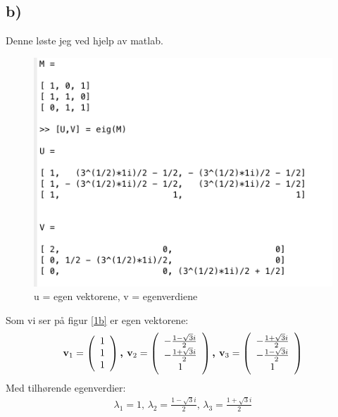 \documentclass[a4paper,12pt,norsk]{article}
\begin{document}
\subsection{b)}
Denne løste jeg ved hjelp av matlab.\\
\begin{figure}[h!]
\includegraphics[width = 1\textwidth]{11b.png} 
\caption{u = egen vektorene, v = egenverdiene}
\label{1b}
\end{figure} 

Som vi ser på figur \vref{1b} er egen vektorene: 
\begin{align*}
\bold{v}_1 = \left({\begin{array}{cc} 1\\ 1\\ 1  \end{array}}\right) \textbf{, }
\bold{v}_2 = \left({\begin{array}{cc} -\frac{1-\sqrt{3}i}{2}\\ -\frac{1+\sqrt{3}i}{2}\\ 1  \end{array}}\right)\textbf{, } 
\bold{v}_3 = \left({\begin{array}{cc} -\frac{1+\sqrt{3}i}{2}\\ -\frac{1-\sqrt{3}i}{2}\\ 1  \end{array}}\right)
\end{align*}
Med tilhørende egenverdier:
\begin{align*}
\lambda_1 = 1 \textbf{, } \lambda_2 = \frac{1-\sqrt{3}i}{2} \textbf{, } \lambda_3 = \frac{1+\sqrt{3}i}{2} 
\end{align*}
\end{document}
